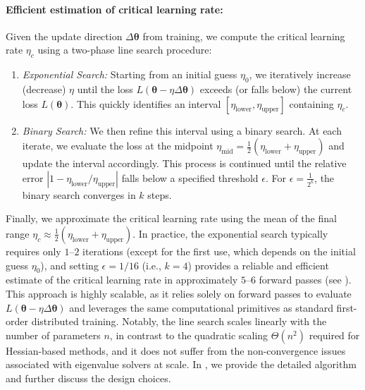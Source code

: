 \documentclass[]{fairmeta}
\theoremstyle{plain}
\theoremstyle{definition}
\begin{document}
\paragraph{\textbf{Efficient estimation of critical learning rate:}} Given the update direction $\Delta \bm{\theta}$ from training, we compute the critical learning rate $\eta_c$ using a two-phase line search procedure:
\begin{enumerate}
    \item \emph{Exponential Search:} Starting from an initial guess $\eta_0$, we iteratively increase (decrease) $\eta$ until the loss $L(\bm{\theta} - \eta \Delta \bm{\theta})$ exceeds (or falls below) the current loss $L(\bm{\theta})$. This quickly identifies an interval $[\eta_{\text{lower}}, \eta_{\text{upper}}]$ containing $\eta_c$.
    \item \emph{Binary Search:} We then refine this interval using a binary search. At each iterate, we evaluate the loss at the midpoint $\eta_{\text{mid}} = \frac{1}{2}(\eta_{\text{lower}} + \eta_{\text{upper}})$ and update the interval accordingly. This process is continued until the relative error $|1 - \eta_{\text{lower}}/ \eta_{\text{upper}}|$ falls below a specified threshold $\epsilon$. For $\epsilon = \frac{1}{2^k}$, the binary search converges in $k$ steps. 
\end{enumerate}

Finally, we approximate the critical learning rate using the mean of the final range $\eta_c \approx \frac{1}{2}(\eta_{\text{lower}} + \eta_{\text{upper}})$.
In practice, the exponential search typically requires only $1$–$2$ iterations (except for the first use, which depends on the initial guess $\eta_0$), and setting $\epsilon = 1/16$ (i.e., $k=4$) provides a reliable and efficient estimate of the critical learning rate in approximately $5$–$6$ forward passes (see ). This approach is highly scalable, as it relies solely on forward passes to evaluate $L(\bm{\theta} - \eta \Delta \bm{\theta})$ and leverages the same computational primitives as standard first-order distributed training. Notably, the line search scales linearly with the number of parameters $n$, in contrast to the quadratic scaling $\Theta(n^2)$ required for Hessian-based methods, and it does not suffer from the non-convergence issues associated with eigenvalue solvers at scale. 
In , we provide the detailed algorithm and further discuss the design choices.
\end{document}

